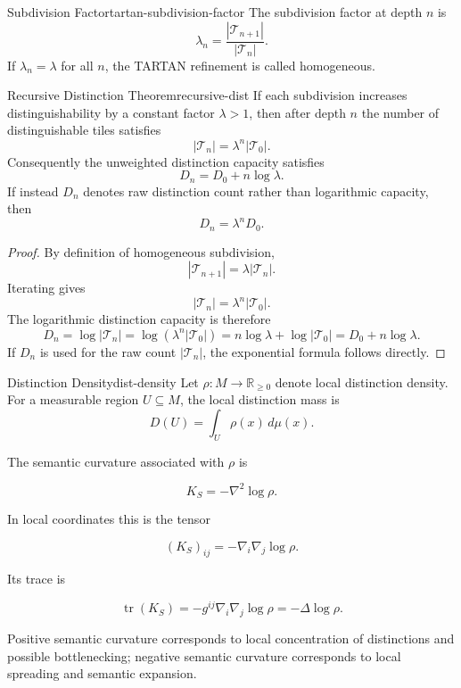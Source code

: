 \documentclass[12pt,twoside,openright]{book}
\begin{document}
\begin{definition}{Subdivision Factor}{tartan-subdivision-factor}
  The subdivision factor at depth \(n\) is
  \[
    \lambda_n
=
    \frac{|\mathcal T_{n+1}|}{|\mathcal T_n|}.
  \]
  If \(\lambda_n=\lambda\) for all \(n\), the TARTAN
  refinement is called homogeneous.
\end{definition}

\begin{theorem}{Recursive Distinction Theorem}{recursive-dist}
  If each subdivision increases distinguishability by a
  constant factor \(\lambda>1\), then after depth \(n\)
  the number of distinguishable tiles satisfies
  \[
    |\mathcal T_n|
=
    \lambda^n|\mathcal T_0|.
  \]
  Consequently the unweighted distinction capacity satisfies
  \[
    D_n
=
    D_0+n\log\lambda.
  \]
  If instead \(D_n\) denotes raw distinction count rather
  than logarithmic capacity, then
  \[
    D_n=\lambda^nD_0.
  \]
\end{theorem}

\begin{proof}
  By definition of homogeneous subdivision,
  \[
    |\mathcal T_{n+1}|
=
    \lambda|\mathcal T_n|.
  \]
  Iterating gives
  \[
    |\mathcal T_n|
=
    \lambda^n|\mathcal T_0|.
  \]
  The logarithmic distinction capacity is therefore
  \[
    D_n
=
    \log|\mathcal T_n|
=
    \log(\lambda^n|\mathcal T_0|)
=
    n\log\lambda+\log|\mathcal T_0|
=
    D_0+n\log\lambda.
  \]
  If \(D_n\) is used for the raw count
  \( |\mathcal T_n| \), the exponential formula follows
  directly.
\end{proof}

\begin{definition}{Distinction Density}{dist-density}
  Let \(\rho:M\to\mathbb R_{\ge0}\) denote local
  distinction density. For a measurable region \(U\subseteq M\),
  the local distinction mass is
  \[
    D(U)=\int_U \rho(x)\,d\mu(x).
  \]
\end{definition}

The semantic curvature associated with \(\rho\) is

\[
K_S
=
-\nabla^2\log\rho.
\]

In local coordinates this is the tensor

\[
(K_S)_{ij}
=
-\nabla_i\nabla_j\log\rho.
\]

Its trace is

\[
\operatorname{tr}(K_S)
=
-g^{ij}\nabla_i\nabla_j\log\rho
=
-\Delta\log\rho.
\]

Positive semantic curvature corresponds to local
concentration of distinctions and possible bottlenecking;
negative semantic curvature corresponds to local spreading
and semantic expansion.
\end{document}
